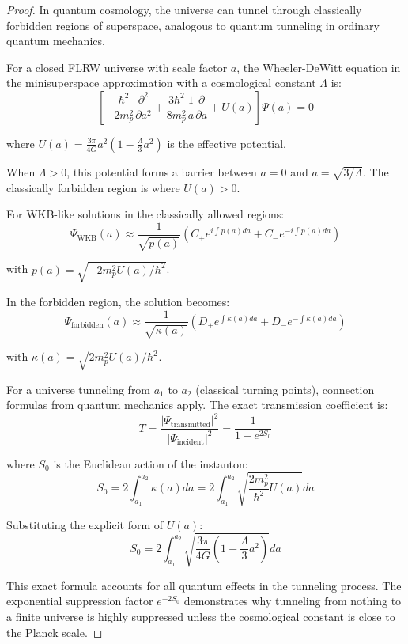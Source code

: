 \documentclass{article}
\begin{document}
\begin{proof}
In quantum cosmology, the universe can tunnel through classically forbidden regions of superspace, analogous to quantum tunneling in ordinary quantum mechanics.

For a closed FLRW universe with scale factor $a$, the Wheeler-DeWitt equation in the minisuperspace approximation with a cosmological constant $\Lambda$ is:
\begin{equation}
\left[-\frac{\hbar^2}{2m_p^2}\frac{\partial^2}{\partial a^2} + \frac{3\hbar^2}{8m_p^2}\frac{1}{a}\frac{\partial}{\partial a} + U(a)\right]\Psi(a) = 0
\end{equation}

where $U(a) = \frac{3\pi}{4G}a^2\left(1-\frac{\Lambda}{3}a^2\right)$ is the effective potential.

When $\Lambda > 0$, this potential forms a barrier between $a=0$ and $a=\sqrt{3/\Lambda}$. The classically forbidden region is where $U(a) > 0$.

For WKB-like solutions in the classically allowed regions:
\begin{equation}
\Psi_\text{WKB}(a) \approx \frac{1}{\sqrt{p(a)}}\left(C_+ e^{i\int p(a)da} + C_- e^{-i\int p(a)da}\right)
\end{equation}

with $p(a) = \sqrt{-2m_p^2 U(a)/\hbar^2}$.

In the forbidden region, the solution becomes:
\begin{equation}
\Psi_\text{forbidden}(a) \approx \frac{1}{\sqrt{\kappa(a)}}\left(D_+ e^{\int \kappa(a)da} + D_- e^{-\int \kappa(a)da}\right)
\end{equation}

with $\kappa(a) = \sqrt{2m_p^2 U(a)/\hbar^2}$.

For a universe tunneling from $a_1$ to $a_2$ (classical turning points), connection formulas from quantum mechanics apply. The exact transmission coefficient is:
\begin{equation}
T = \frac{|\Psi_\text{transmitted}|^2}{|\Psi_\text{incident}|^2} = \frac{1}{1 + e^{2S_0}}
\end{equation}

where $S_0$ is the Euclidean action of the instanton:
\begin{equation}
S_0 = 2\int_{a_1}^{a_2}\kappa(a)da = 2\int_{a_1}^{a_2}\sqrt{\frac{2m_p^2}{\hbar^2}U(a)}da
\end{equation}

Substituting the explicit form of $U(a)$:
\begin{equation}
S_0 = 2\int_{a_1}^{a_2}\sqrt{\frac{3\pi}{4G}\left(1-\frac{\Lambda}{3}a^2\right)}da
\end{equation}

This exact formula accounts for all quantum effects in the tunneling process. The exponential suppression factor $e^{-2S_0}$ demonstrates why tunneling from nothing to a finite universe is highly suppressed unless the cosmological constant is close to the Planck scale.
\end{proof}
\end{document}
